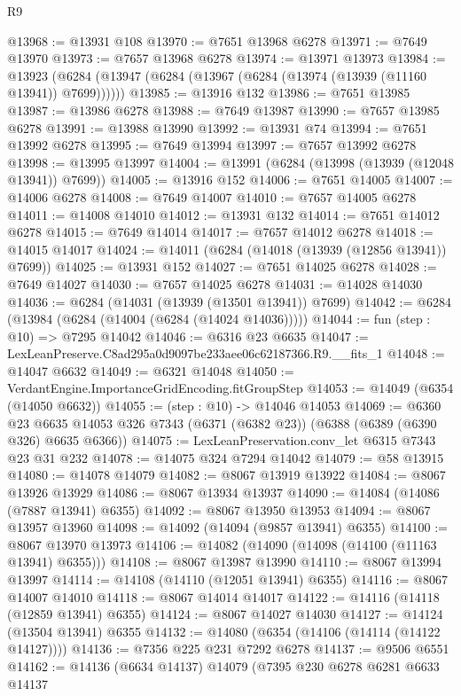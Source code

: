 \begin{lexlean}{R9}
\begin{coremodule}
@13968 := @13931 @108
@13970 := @7651 @13968 @6278
@13971 := @7649 @13970
@13973 := @7657 @13968 @6278
@13974 := @13971 @13973
@13984 := @13923 (@6284 (@13947 (@6284 (@13967 (@6284 (@13974 (@13939 (@11160 @13941)) @7699))))))
@13985 := @13916 @132
@13986 := @7651 @13985
@13987 := @13986 @6278
@13988 := @7649 @13987
@13990 := @7657 @13985 @6278
@13991 := @13988 @13990
@13992 := @13931 @74
@13994 := @7651 @13992 @6278
@13995 := @7649 @13994
@13997 := @7657 @13992 @6278
@13998 := @13995 @13997
@14004 := @13991 (@6284 (@13998 (@13939 (@12048 @13941)) @7699))
@14005 := @13916 @152
@14006 := @7651 @14005
@14007 := @14006 @6278
@14008 := @7649 @14007
@14010 := @7657 @14005 @6278
@14011 := @14008 @14010
@14012 := @13931 @132
@14014 := @7651 @14012 @6278
@14015 := @7649 @14014
@14017 := @7657 @14012 @6278
@14018 := @14015 @14017
@14024 := @14011 (@6284 (@14018 (@13939 (@12856 @13941)) @7699))
@14025 := @13931 @152
@14027 := @7651 @14025 @6278
@14028 := @7649 @14027
@14030 := @7657 @14025 @6278
@14031 := @14028 @14030
@14036 := @6284 (@14031 (@13939 (@13501 @13941)) @7699)
@14042 := @6284 (@13984 (@6284 (@14004 (@6284 (@14024 @14036)))))
@14044 := fun (step : @10) => @7295 @14042
@14046 := @6316 @23 @6635
@14047 := LexLeanPreserve.C8ad295a0d9097be233aee06c62187366.R9.__fits_1
@14048 := @14047 @6632
@14049 := @6321 @14048
@14050 := VerdantEngine.ImportanceGridEncoding.fitGroupStep
@14053 := @14049 (@6354 (@14050 @6632))
@14055 := (step : @10) -> @14046 @14053
@14069 := @6360
    @23
    @6635
    @14053
    @326
    @7343
    (@6371 (@6382 @23))
    (@6388 (@6389 (@6390 @326) @6635 @6366))
@14075 := LexLeanPreservation.conv_let @6315 @7343 @23 @31 @232
@14078 := @14075 @324 @7294 @14042
@14079 := @58 @13915
@14080 := @14078 @14079
@14082 := @8067 @13919 @13922
@14084 := @8067 @13926 @13929
@14086 := @8067 @13934 @13937
@14090 := @14084 (@14086 (@7887 @13941) @6355)
@14092 := @8067 @13950 @13953
@14094 := @8067 @13957 @13960
@14098 := @14092 (@14094 (@9857 @13941) @6355)
@14100 := @8067 @13970 @13973
@14106 := @14082 (@14090 (@14098 (@14100 (@11163 @13941) @6355)))
@14108 := @8067 @13987 @13990
@14110 := @8067 @13994 @13997
@14114 := @14108 (@14110 (@12051 @13941) @6355)
@14116 := @8067 @14007 @14010
@14118 := @8067 @14014 @14017
@14122 := @14116 (@14118 (@12859 @13941) @6355)
@14124 := @8067 @14027 @14030
@14127 := @14124 (@13504 @13941) @6355
@14132 := @14080 (@6354 (@14106 (@14114 (@14122 @14127))))
@14136 := @7356 @225 @231 @7292 @6278
@14137 := @9506 @6551
@14162 := @14136
    (@6634 @14137)
    @14079
    (@7395
      @230
      @6278
      @6281
      @6633
      @14137

\end{coremodule}
\end{lexlean}
